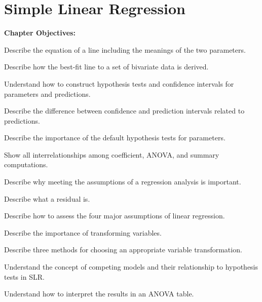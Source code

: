 \documentclass[10pt,openany]{book}\usepackage[]{graphicx}\usepackage[]{color}
\begin{document}
\chapter{Simple Linear Regression}  \label{chap:LMRegression1}
  \vspace{0pt}
    \begin{ChapObj}{\boxwidth}
      \textbf{Chapter Objectives:}
        \begin{Enumerate}
          \item Describe the equation of a line including the meanings of the two parameters.
          \item Describe how the best-fit line to a set of bivariate data is derived.
          \item Understand how to construct hypothesis tests and confidence intervals for parameters and predictions.
          \item Describe the difference between confidence and prediction intervals related to predictions.
          \item Describe the importance of the default hypothesis tests for parameters.
          \item Show all interrelationships among coefficient, ANOVA, and summary computations.
          \item Describe why meeting the assumptions of a regression analysis is important.
          \item Describe what a residual is.
          \item Describe how to assess the four major assumptions of linear regression.
          \item Describe the importance of transforming variables.
          \item Describe three methods for choosing an appropriate variable transformation.
          \item Understand the concept of competing models and their relationship to hypothesis tests in SLR.
          \item Understand how to interpret the results in an ANOVA table.
        \end{Enumerate}
    \end{ChapObj}
  \vspace{-12pt}
\minitoc
\newpage
\end{document}
